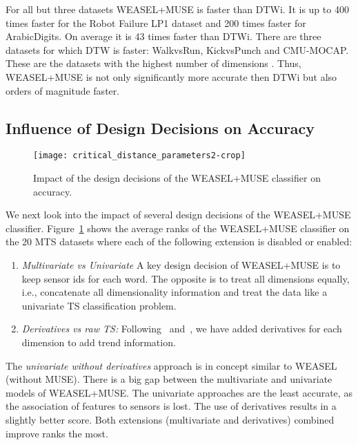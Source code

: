 \documentclass[sigconf]{acmart}
\begin{document}
For all but three datasets WEASEL+MUSE is faster than DTWi. It is up to 400 times faster for the Robot Failure LP1 dataset and 200 times faster for ArabicDigits. On average it is 43 times faster than DTWi. There are three datasets for which DTW is faster: WalkvsRun, KickvsPunch and CMU-MOCAP. These are the datasets with the highest number of dimensions . 
Thus, WEASEL+MUSE is not only significantly more accurate then DTWi but also orders of magnitude faster.



\subsection{Influence of Design Decisions on Accuracy}\label{subsec:influence}

\begin{figure}[h]
	\texttt{[image: critical\_distance\_parameters2-crop]}
	\caption{Impact of the design decisions of the WEASEL+MUSE classifier on accuracy.\label{fig:Impact-of-design}}
\end{figure}

We next look into the impact of several design decisions of the WEASEL+MUSE classifier. Figure~\ref{fig:Impact-of-design} shows the average ranks of the WEASEL+MUSE classifier on the 20 MTS datasets where each of the following extension is disabled or enabled: 

 \begin{enumerate}
	\item \emph{Multivariate vs Univariate} A key design decision of WEASEL+MUSE is to keep sensor ids for each word. The opposite is to treat all dimensions equally, i.e., concatenate all dimensionality information and treat the data like a univariate TS classification problem.
	\item \emph{Derivatives vs raw TS:} Following~\cite{wistuba2015ultra} and~\cite{baydogan2015learning}, we have added derivatives for each dimension to add trend information.
 \end{enumerate}

The \emph{univariate without derivatives} approach is in concept similar to WEASEL (without MUSE). There is a big gap between the multivariate and univariate models of WEASEL+MUSE. The univariate approaches are the least accurate, as the association of features to sensors is lost. The use of derivatives results in a slightly better score. Both extensions (multivariate and derivatives) combined improve ranks the most. 
\end{document}

